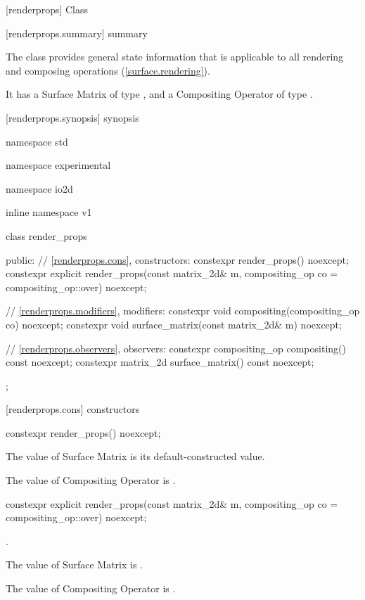 
 [renderprops] {Class }

 [renderprops.summary] { summary}

\pnum
The  class provides general state information that is applicable to all rendering and composing operations (\ref{surface.rendering}).

\pnum
It has a Surface Matrix of type , and a Compositing Operator of type .

 [renderprops.synopsis] { synopsis}

\begin{codeblock}
namespace std { namespace experimental { namespace io2d { inline namespace v1 {
  class render_props {
  public:
    // \ref{renderprops.cons}, constructors:
    constexpr render_props() noexcept;
    constexpr explicit render_props(const matrix_2d& m,
      compositing_op co = compositing_op::over) noexcept;
    
    // \ref{renderprops.modifiers}, modifiers:
    constexpr void compositing(compositing_op co) noexcept;
    constexpr void surface_matrix(const matrix_2d& m) noexcept;
    
    // \ref{renderprops.observers}, observers:
    constexpr compositing_op compositing() const noexcept;
    constexpr matrix_2d surface_matrix() const noexcept;
  };
}}}}
\end{codeblock}

 [renderprops.cons] { constructors}

\begin{itemdecl}
constexpr render_props() noexcept;
\end{itemdecl}
\begin{itemdescr}
\pnum
\effects
The value of Surface Matrix is its default-constructed value.

\pnum
The value of Compositing Operator is .
\end{itemdescr}

\begin{itemdecl}
constexpr explicit render_props(const matrix_2d& m,
  compositing_op co = compositing_op::over) noexcept;
\end{itemdecl}
\begin{itemdescr}
\pnum
\requires
{}.

\pnum
\effects
The value of Surface Matrix is .

\pnum
The value of Compositing Operator is .
\end{itemdescr}

